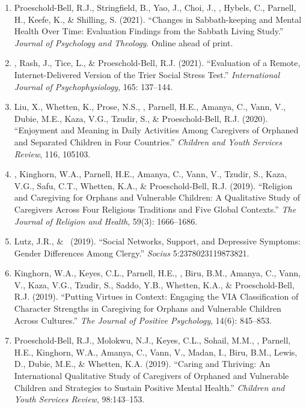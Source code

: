 \begin{enumerate}
\item Proeschold-Bell, R.J., Stringfield, B., Yao, J., Choi, J., \Eagle, Hybels, C., Parnell, H., Keefe, K., \& Shilling, S. (2021). ``Changes in Sabbath-keeping and Mental Health Over Time: Evaluation Findings from the Sabbath Living Study.'' \emph{Journal of Psychology and Theology}. Online ahead of print. 

\item \Eagle, Rash, J., Tice, L., \& Proeschold-Bell, R.J. (2021). ``Evaluation of a Remote, Internet-Delivered Version of the Trier Social Stress Test.'' \emph{International Journal of Psychophysiology}, 165: 137--144. 

\item Liu, X., Whetten, K., Prose, N.S., \Eagle, Parnell, H.E., Amanya, C., Vann, V., Dubie, M.E., Kaza, V.G., Tzudir, S., \& Proeschold-Bell, R.J. (2020). ``Enjoyment and Meaning in Daily Activities Among Caregivers of Orphaned and Separated Children in Four Countries.'' \emph{Children and Youth Services Review}, 116, 105103. 

\item \Eagle, Kinghorn, W.A., Parnell, H.E., Amanya, C., Vann, V., Tzudir, S., Kaza, V.G., Safu, C.T., Whetten, K.A., \& Proeschold-Bell, R.J. (2019). ``Religion and Caregiving for Orphans and Vulnerable Children: A Qualitative Study of Caregivers Across Four Religious Traditions and Five Global Contexts.'' \emph{The Journal of Religion and Health}, 59(3): 1666--1686. 

\item Lutz, J.R., \& \Eagle\CS\ (2019). ``Social Networks, Support, and Depressive Symptoms: Gender Differences Among Clergy.'' \emph{Socius} 5:2378023119873821. 

\item Kinghorn, W.A., Keyes, C.L., Parnell, H.E., \Eagle, Biru, B.M., Amanya, C., Vann, V., Kaza, V.G., Tzudir, S., Saddo, Y.B., Whetten, K.A., \& Proeschold-Bell, R.J. (2019). ``Putting Virtues in Context: Engaging the VIA Classification of Character Strengths in Caregiving for Orphans and Vulnerable Children Across Cultures.'' \emph{The Journal of Positive Psychology}, 14(6): 845--853. 

\item Proeschold-Bell, R.J., Molokwu, N.J., Keyes, C.L., Sohail, M.M., \Eagle, Parnell, H.E., Kinghorn, W.A., Amanya, C., Vann, V., Madan, I., Biru, B.M., Lewis, D., Dubie, M.E., \& Whetten, K.A. (2019). ``Caring and Thriving: An International Qualitative Study of Caregivers of Orphaned and Vulnerable Children and Strategies to Sustain Positive Mental Health.'' \emph{Children and Youth Services Review}, 98:143--153. 


\end{enumerate}
